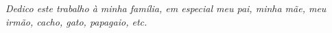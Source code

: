 \begin{dedicatoria} 
\vspace*{\fill} 
\begin{flushright}
\textit{Dedico este trabalho à minha família, em especial meu pai, minha mãe, meu irmão, cacho, gato, papagaio, etc.}
\end{flushright}
\vspace*{\fill} 
\end{dedicatoria}
\newpage